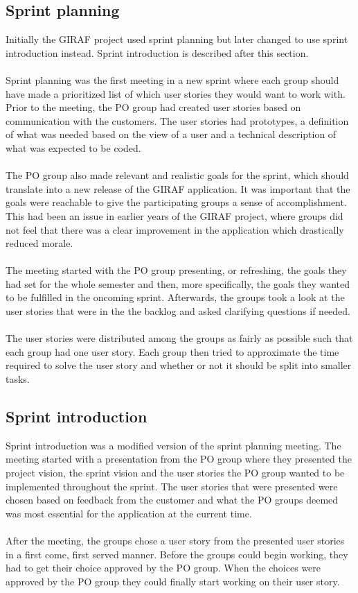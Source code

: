 \subsection{Sprint planning} \label{subsec:sprint-planning}
Initially the GIRAF project used sprint planning but later changed to use sprint introduction instead.
Sprint introduction is described after this section.
\\
\\
Sprint planning was the first meeting in a new sprint where each group should have made a prioritized list of which user stories they would want to work with.
Prior to the meeting, the PO group had created user stories based on communication with the customers.
The user stories had prototypes, a definition of what was needed based on the view of a user and a technical description of what was expected to be coded.
\\
\\
The PO group also made relevant and realistic goals for the sprint, which should translate into a new release of the GIRAF application.
It was important that the goals were reachable to give the participating groups a sense of accomplishment.
This had been an issue in earlier years of the GIRAF project, where groups did not feel that there was a clear improvement in the application which drastically reduced morale.
\\
\\
The meeting started with the PO group presenting, or refreshing, the goals they had set for the whole semester and then, more specifically, the goals they wanted to be fulfilled in the oncoming sprint.
Afterwards, the groups took a look at the user stories that were in the the backlog and asked clarifying questions if needed.
\\
\\
The user stories were distributed among the groups as fairly as possible such that each group had one user story.
Each group then tried to approximate the time required to solve the user story and whether or not it should be split into smaller tasks.


\subsection{Sprint introduction} \label{subsec:sprint-introduction}
Sprint introduction was a modified version of the sprint planning meeting.
The meeting started with a presentation from the PO group where they presented the project vision, the sprint vision and the user stories the PO group wanted to be implemented throughout the sprint.
The user stories that were presented were chosen based on feedback from the customer and what the PO groups deemed was most essential for the application at the current time.
\\
\\
After the meeting, the groups chose a user story from the presented user stories in a first come, first served manner.
Before the groups could begin working, they had to get their choice approved by the PO group.
When the choices were approved by the PO group they could finally start working on their user story.

